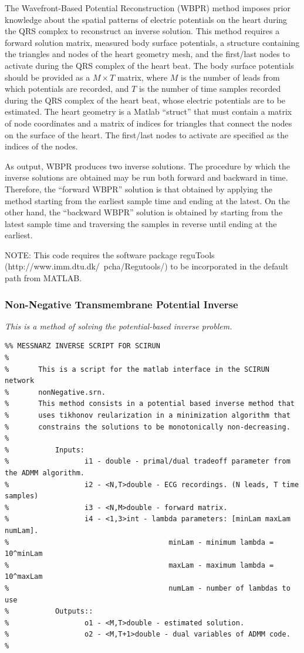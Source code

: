 \documentclass[fleqn,11pt,openany]{book}
\begin{document}
The Wavefront-Based Potential Reconstruction (WBPR) method imposes prior knowledge about the spatial patterns of electric potentials on the heart during the QRS complex to reconstruct an inverse solution. This method requires a forward solution matrix, measured body surface potentials, a structure containing the triangles and nodes of the heart geometry mesh, and the first/last nodes to activate during the QRS complex of the heart beat. The body surface potentials should be provided as a $M \times T$ matrix, where $M$ is the number of leads from which potentials are recorded, and $T$ is the number of time samples recorded during the QRS complex of the heart beat, whose electric potentials are to be estimated. The heart geometry is a Matlab ``struct'' that must contain a matrix of node coordinates and a matrix of indices for triangles that connect the nodes on the surface of the heart. The first/last nodes to activate are specified as the indices of the nodes.

As output, WBPR produces two inverse solutions. The procedure by which the inverse solutions are obtained may be run both forward and backward in time. Therefore, the ``forward WBPR'' solution is that obtained by applying the method starting from the earliest sample time and ending at the latest. On the other hand, the ``backward WBPR'' solution is obtained by starting from the latest sample time and traversing the samples in reverse until ending at the earliest.

NOTE: This code requires the software package reguTools (http://www.imm.dtu.dk/~pcha/Regutools/) to be incorporated in the default path from MATLAB.


\subsubsection{Non-Negative Transmembrane Potential Inverse}

\vspace{5pt}\textit{This is a method of solving the potential-based inverse problem.}\vspace{5pt}
\begin{verbatim}
%% MESSNARZ INVERSE SCRIPT FOR SCIRUN
%
%		This is a script for the matlab interface in the SCIRUN network
%		nonNegative.srn.
%		This method consists in a potential based inverse method that 
%		uses tikhonov reularization in a minimization algorithm that 
%		constrains the solutions to be monotonically non-decreasing.
%		
%			Inputs:
%				   i1 - double - primal/dual tradeoff parameter from the ADMM algorithm.
%				   i2 - <N,T>double - ECG recordings. (N leads, T time samples)
%				   i3 - <N,M>double - forward matrix.
%				   i4 - <1,3>int - lambda parameters: [minLam maxLam numLam].
%			                           minLam - minimum lambda = 10^minLam
%			                           maxLam - maximum lambda = 10^maxLam
%			                           numLam - number of lambdas to use 
%			Outputs::
%				   o1 - <M,T>double - estimated solution.
%				   o2 - <M,T+1>double - dual variables of ADMM code.
%
\end{verbatim}
\end{document}
